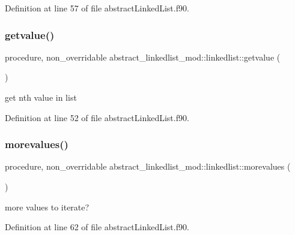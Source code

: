 Definition at line 57 of file abstract\+Linked\+List.\+f90.

\mbox{\label{structabstract__linkedlist__mod_1_1linkedlist_a5c7d60d9f9213b87eed9ce5350a72460}} 
\subsubsection{\texorpdfstring{getvalue()}{getvalue()}}
{\footnotesize\ttfamily procedure, non\+\_\+overridable abstract\+\_\+linkedlist\+\_\+mod\+::linkedlist\+::getvalue (\begin{DoxyParamCaption}{ }\end{DoxyParamCaption})\hspace{0.3cm}{\ttfamily [private]}}



get nth value in list 



Definition at line 52 of file abstract\+Linked\+List.\+f90.

\mbox{\label{structabstract__linkedlist__mod_1_1linkedlist_adac9f898125d07bacdee51f7beed0ec1}} 
\subsubsection{\texorpdfstring{morevalues()}{morevalues()}}
{\footnotesize\ttfamily procedure, non\+\_\+overridable abstract\+\_\+linkedlist\+\_\+mod\+::linkedlist\+::morevalues (\begin{DoxyParamCaption}{ }\end{DoxyParamCaption})\hspace{0.3cm}{\ttfamily [private]}}



more values to iterate? 



Definition at line 62 of file abstract\+Linked\+List.\+f90.


